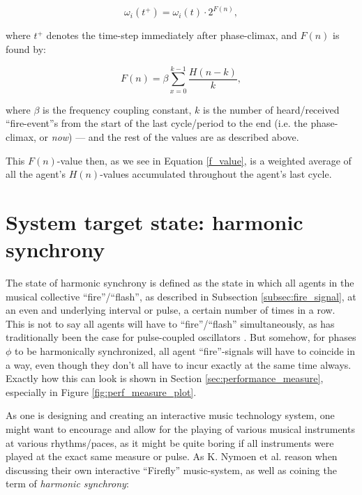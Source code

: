 \begin{equation}
\label{freq_adj}
	\omega_i(t^+) = \omega_i(t) \cdot 2^{F(n)},
\end{equation}

where $t^+$ denotes the time-step immediately after phase-climax, and $F(n)$ is found by:

\begin{equation}
\label{f_value}
	F(n) = \beta\sum_{x=0}^{k-1}\frac{H(n-k)}{k},
\end{equation}

where $\beta$ is the frequency coupling constant, $k$ is the number of heard/received ``fire-event''s from the start of the last cycle/period to the end (i.e. the phase-climax, or \textit{now}) — and the rest of the values are as described above.

This $F(n)$-value then, as we see in Equation \eqref{f_value}, is a weighted average of all the agent's $H(n)$-values accumulated throughout the agent's last cycle.















\section{System target state: harmonic synchrony}
\label{sec:harmonic_synchrony}

The state of harmonic synchrony is defined \cite{nymoen_synch} as the state in which all agents in the musical collective ``fire''/``flash'', as described in Subsection \ref{subsec:fire_signal}, at an even and underlying interval or pulse, a certain number of times in a row. This is not to say all agents will have to ``fire''/``flash'' simultaneously, as has traditionally been the case for pulse-coupled oscillators \cite{}. But somehow, for phases $\phi$ to be harmonically synchronized, all agent ``fire''-signals will have to coincide in a way, even though they don't all have to incur exactly at the same time always. Exactly how this can look is shown in Section \ref{sec:performance_measure}, especially in Figure \ref{fig:perf_measure_plot}.

As one is designing and creating an interactive music technology system, one might want to encourage and allow for the playing of various musical instruments at various rhythms/paces, as it might be quite boring if all instruments were played at the exact same measure or pulse. As K. Nymoen et al. \cite{nymoen_synch} reason when discussing their own interactive ``Firefly'' music-system, as well as coining the term of \textit{harmonic synchrony}: \nl

